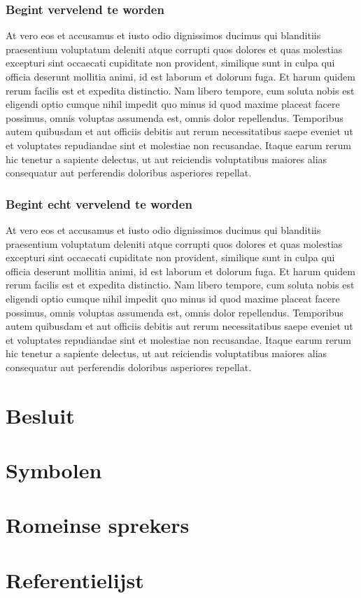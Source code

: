 \documentclass[a4paper,11pt,oneside,openright,english,copyright]{kdgcoursetext}
\begin{document}
\subsection{Begint vervelend te worden}
At vero eos et accusamus et iusto odio dignissimos ducimus qui
blanditiis praesentium voluptatum deleniti atque corrupti quos dolores
et quas molestias excepturi sint occaecati cupiditate non provident,
similique sunt in culpa qui officia deserunt mollitia animi, id est
laborum et dolorum fuga. Et harum quidem rerum facilis est et expedita
distinctio. Nam libero tempore, cum soluta nobis est eligendi optio
cumque nihil impedit quo minus id quod maxime placeat facere possimus,
omnis voluptas assumenda est, omnis dolor repellendus. Temporibus
autem quibusdam et aut officiis debitis aut rerum necessitatibus saepe
eveniet ut et voluptates repudiandae sint et molestiae non
recusandae. Itaque earum rerum hic tenetur a sapiente delectus, ut aut
reiciendis voluptatibus maiores alias consequatur aut perferendis
doloribus asperiores repellat.

\newpage

\subsection{Begint echt vervelend te worden}
At vero eos et accusamus et iusto odio dignissimos ducimus qui
blanditiis praesentium voluptatum deleniti atque corrupti quos dolores
et quas molestias excepturi sint occaecati cupiditate non provident,
similique sunt in culpa qui officia deserunt mollitia animi, id est
laborum et dolorum fuga. Et harum quidem rerum facilis est et expedita
distinctio. Nam libero tempore, cum soluta nobis est eligendi optio
cumque nihil impedit quo minus id quod maxime placeat facere possimus,
omnis voluptas assumenda est, omnis dolor repellendus. Temporibus
autem quibusdam et aut officiis debitis aut rerum necessitatibus saepe
eveniet ut et voluptates repudiandae sint et molestiae non
recusandae. Itaque earum rerum hic tenetur a sapiente delectus, ut aut
reiciendis voluptatibus maiores alias consequatur aut perferendis
doloribus asperiores repellat.

\chapter{Besluit}

\backmatter
\appendix

\chapter{Symbolen}
\chapter{Romeinse sprekers}
\chapter{Referentielijst}
\end{document}
